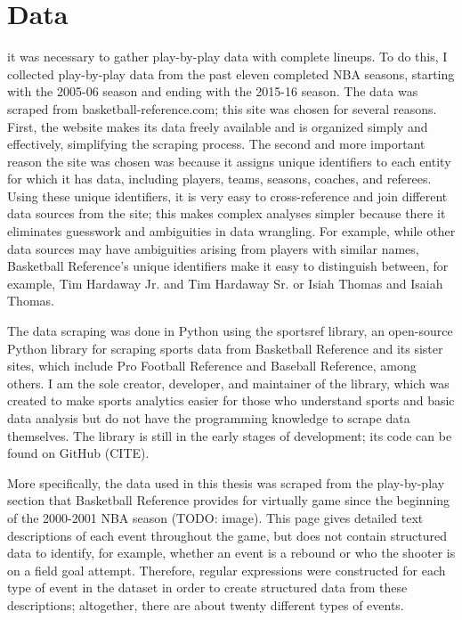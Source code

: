 
\chapter{Data} \label{ch:data}
\nocite{*}

 it was necessary to gather
play-by-play data with complete lineups. To do this, I collected play-by-play data
from the past eleven completed NBA seasons, starting with the 2005-06 season and
ending with the 2015-16 season. The data was scraped from basketball-reference.com;
this site was chosen for several reasons. First, the website makes its data freely
available and is organized simply and effectively, simplifying the scraping process.
The second and more important reason the site was chosen was because it assigns
unique identifiers to each entity for which it has data, including players, teams,
seasons, coaches, and referees. Using these unique identifiers, it is very easy to
cross-reference and join different data sources from the site; this makes complex
analyses simpler because there it eliminates guesswork and ambiguities in data
wrangling. For example, while other data sources may have ambiguities arising from
players with similar names, Basketball Reference's unique identifiers make it easy
to distinguish between, for example, Tim Hardaway Jr. and Tim Hardaway Sr. or Isiah
Thomas and Isaiah Thomas.

The data scraping was done in Python using the sportsref library, an open-source
Python library for scraping sports data from Basketball Reference and its sister
sites, which include Pro Football Reference and Baseball Reference, among others. I
am the sole creator, developer, and maintainer of the library, which was
created to make sports analytics easier for those who understand sports and basic
data analysis but do not have the programming knowledge to scrape data themselves.
The library is still in the early stages of development; its code can be found on
GitHub (CITE).

More specifically, the data used in this thesis was scraped from the play-by-play
section that Basketball Reference provides for virtually game since the beginning of
the 2000-2001 NBA season (TODO: image). This page gives detailed text descriptions
of each event throughout the game, but does not contain structured data to identify,
for example, whether an event is a rebound or who the shooter is on a field goal
attempt. Therefore, regular expressions were constructed for each type of event in
the dataset in order to create structured data from these descriptions; altogether,
there are about twenty different types of events.

